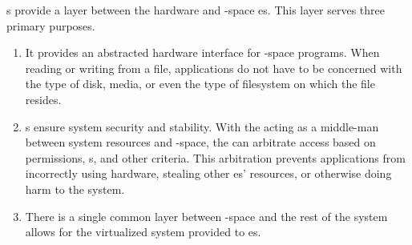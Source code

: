 s provide a layer between the hardware and -space es.
This layer serves three primary purposes.
\begin{enumerate}[noitemsep]
\item It provides an abstracted hardware interface for -space programs.
  When reading or writing from a file, applications do not have to be concerned with the type of disk, media, or even the type of filesystem on which the file resides.
\item {}s ensure system security and stability.
  With the  acting as a middle-man between system resources and -space, the  can arbitrate access based on permissions, s, and other criteria.
  This arbitration prevents applications from incorrectly using hardware, stealing other es’ resources, or otherwise doing harm to the system.
\item There is a single common layer between -space and the rest of the system allows for the virtualized system provided to es.
\end{enumerate}

